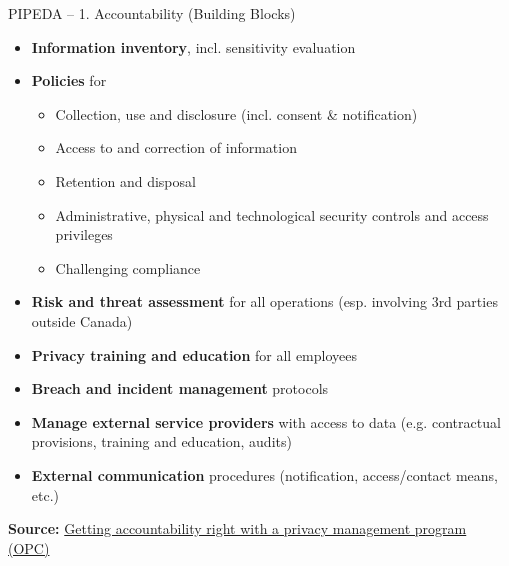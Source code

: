 \documentclass[ignorenonframetext,xcolor=x11names]{beamer}
\begin{document}
\begin{frame}{PIPEDA -- 1. Accountability \small (Building Blocks)}
   \begin{itemize}
      \item \textbf{Information inventory}, incl. sensitivity evaluation
      \item \textbf{Policies} for
         \begin{itemize}
           \item Collection, use and disclosure (incl. consent \& notification)
           \item Access to and correction of information
           \item Retention and disposal
           \item Administrative, physical and technological security controls and access privileges
           \item Challenging compliance
         \end{itemize}
      \item \textbf{Risk and threat assessment} for all operations (esp. involving 3rd parties outside Canada)
      \item \textbf{Privacy training and education} for all employees
      \item \textbf{Breach and incident management} protocols
      \item \textbf{Manage external service providers} with access to data (e.g. contractual provisions, training and education, audits)
      \item \textbf{External communication} procedures (notification, access/contact means, etc.)
   \end{itemize}

\vspace{.5\baselineskip}
\scriptsize \textbf{Source:} \href{https://www.priv.gc.ca/en/privacy-topics/privacy-laws-in-canada/the-personal-information-protection-and-electronic-documents-act-pipeda/pipeda-compliance-help/pipeda-compliance-and-training-tools/gl_acc_201204/}{Getting accountability right with a privacy management program (OPC)}
\end{frame}
\end{document}
